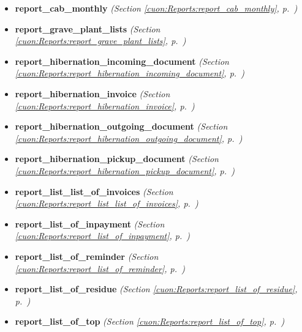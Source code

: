 \begin{itemize}
\begin{itemize}
    \item \textbf{report\_cab\_monthly}
  \textit{(Section \ref{cuon:Reports:report_cab_monthly}, p.~\pageref{cuon:Reports:report_cab_monthly})}

    \item \textbf{report\_grave\_plant\_lists}
  \textit{(Section \ref{cuon:Reports:report_grave_plant_lists}, p.~\pageref{cuon:Reports:report_grave_plant_lists})}

    \item \textbf{report\_hibernation\_incoming\_document}
  \textit{(Section \ref{cuon:Reports:report_hibernation_incoming_document}, p.~\pageref{cuon:Reports:report_hibernation_incoming_document})}

    \item \textbf{report\_hibernation\_invoice}
  \textit{(Section \ref{cuon:Reports:report_hibernation_invoice}, p.~\pageref{cuon:Reports:report_hibernation_invoice})}

    \item \textbf{report\_hibernation\_outgoing\_document}
  \textit{(Section \ref{cuon:Reports:report_hibernation_outgoing_document}, p.~\pageref{cuon:Reports:report_hibernation_outgoing_document})}

    \item \textbf{report\_hibernation\_pickup\_document}
  \textit{(Section \ref{cuon:Reports:report_hibernation_pickup_document}, p.~\pageref{cuon:Reports:report_hibernation_pickup_document})}

    \item \textbf{report\_list\_list\_of\_invoices}
  \textit{(Section \ref{cuon:Reports:report_list_list_of_invoices}, p.~\pageref{cuon:Reports:report_list_list_of_invoices})}

    \item \textbf{report\_list\_of\_inpayment}
  \textit{(Section \ref{cuon:Reports:report_list_of_inpayment}, p.~\pageref{cuon:Reports:report_list_of_inpayment})}

    \item \textbf{report\_list\_of\_reminder}
  \textit{(Section \ref{cuon:Reports:report_list_of_reminder}, p.~\pageref{cuon:Reports:report_list_of_reminder})}

    \item \textbf{report\_list\_of\_residue}
  \textit{(Section \ref{cuon:Reports:report_list_of_residue}, p.~\pageref{cuon:Reports:report_list_of_residue})}

    \item \textbf{report\_list\_of\_top}
  \textit{(Section \ref{cuon:Reports:report_list_of_top}, p.~\pageref{cuon:Reports:report_list_of_top})}


\end{itemize}
\end{itemize}
